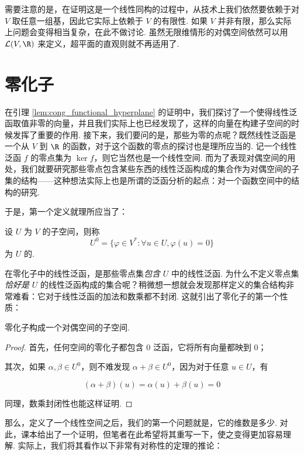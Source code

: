 需要注意的是，在证明这是一个线性同构的过程中，从技术上我们依然要依赖于对 $V$ 取任意一组基，因此它实际上依赖于 $V$ 的有限性. 如果 $V$ 并非有限，那么实际上问题会变得相当复杂，在此不做讨论. 虽然无限维情形的对偶空间依然可以用 $\mathcal{L}(V, \R)$ 来定义，超平面的直观则就不再适用了.

\section{零化子}

在引理 \ref{lem:cong_functional_hyperplane} 的证明中，我们探讨了一个使得线性泛函取值非零的向量，并且我们实际上也已经发现了，这样的向量在构建子空间的时候发挥了重要的作用. 接下来，我们要问的是，那些为零的点呢？既然线性泛函是一个从 $V$ 到 $\R$ 的函数，对于这个函数的零点的探讨也是理所应当的. 记一个线性泛函 $f$ 的零点集为 $\ker f$，则它当然也是一个线性空间. 而为了表现对偶空间的用处，我们就要研究那些零点包含某些东西的线性泛函构成的集合作为对偶空间的子集的结构——这种想法实际上也是所谓的泛函分析的起点：对一个函数空间中的结构的研究.

于是，第一个定义就理所应当了：

\begin{definition}{}{}
    设 $U$ 为 $V$ 的子空间，则称
    \[
        U^0 = \{\varphi \in V^*: \forall u \in U, \varphi(u) = 0\}
    \]
    为 $U$ 的.
\end{definition}

在零化子中的线性泛函，是那些零点集\emph{包含} $U$ 中的线性泛函. 为什么不定义零点集\emph{恰好是} $U$ 的线性泛函构成的集合呢？稍微想一想就会发现那样定义的集合结构非常难看：它对于线性泛函的加法和数乘都不封闭. 这就引出了零化子的第一个性质：

\begin{theorem}{}{}
    零化子构成一个对偶空间的子空间.
\end{theorem}

\begin{proof}
    首先，任何空间的零化子都包含 $0$ 泛函，它将所有向量都映到 $0$；

    其次，如果 $\alpha, \beta \in U^0$，则不难发现 $\alpha + \beta \in U^0$，因为对于任意 $u \in U$，有

    \[
        (\alpha + \beta) (u) = \alpha (u) + \beta (u) = 0
    \]

    同理，数乘封闭性也能这样证明.
\end{proof}

那么，定义了一个线性空间之后，我们的第一个问题就是，它的维数是多少. 对此，课本给出了一个证明，但笔者在此希望将其重写一下，使之变得更加容易理解. 实际上，我们将其看作以下非常有对称性的定理的推论：

